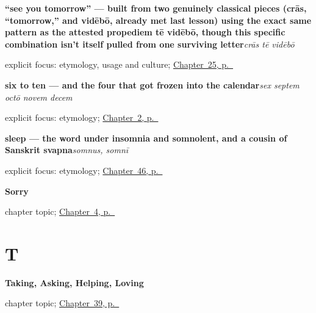 \noindent\begin{minipage}[t]{\linewidth}
\raggedright
\textbf{\textquotedblleft{}see you tomorrow\textquotedblright{} — built from two genuinely classical pieces (crās, \textquotedblleft{}tomorrow,\textquotedblright{} and vidēbō, already met last lesson) using the exact same pattern as the attested propediem tē vidēbō, though this specific combination isn't itself pulled from one surviving letter}\enspace\emph{crās tē vidēbō}\par
\footnotesize explicit focus: etymology, usage and culture; \hyperref[ch:la-see-you-tomorrow]{Chapter~25, p.~\pageref*{ch:la-see-you-tomorrow}}
\end{minipage}\par\smallskip

\noindent\begin{minipage}[t]{\linewidth}
\raggedright
\textbf{six to ten — and the four that got frozen into the calendar}\enspace\emph{sex septem octō novem decem}\par
\footnotesize explicit focus: etymology; \hyperref[ch:la-numbers-one-to-ten]{Chapter~2, p.~\pageref*{ch:la-numbers-one-to-ten}}
\end{minipage}\par\smallskip

\noindent\begin{minipage}[t]{\linewidth}
\raggedright
\textbf{sleep — the word under insomnia and somnolent, and a cousin of Sanskrit svapna}\enspace\emph{somnus, somnī}\par
\footnotesize explicit focus: etymology; \hyperref[ch:la-lux]{Chapter~46, p.~\pageref*{ch:la-lux}}
\end{minipage}\par\smallskip

\noindent\begin{minipage}[t]{\linewidth}
\raggedright
\textbf{Sorry}\par
\footnotesize chapter topic; \hyperref[ch:la-sorry]{Chapter~4, p.~\pageref*{ch:la-sorry}}
\end{minipage}\par\smallskip

\section*{T}

\noindent\begin{minipage}[t]{\linewidth}
\raggedright
\textbf{Taking, Asking, Helping, Loving}\par
\footnotesize chapter topic; \hyperref[ch:la-doing-verbs]{Chapter~39, p.~\pageref*{ch:la-doing-verbs}}
\end{minipage}\par\smallskip

